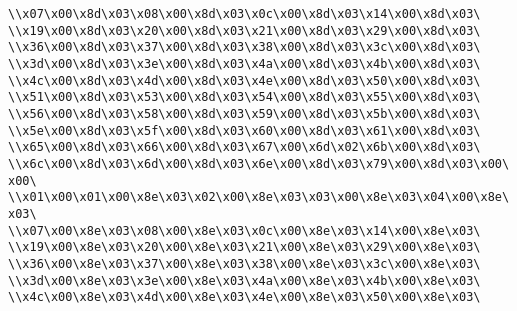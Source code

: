 \verb|\\x07\x00\x8d\x03\x08\x00\x8d\x03\x0c\x00\x8d\x03\x14\x00\x8d\x03\|\newline
\verb|\\x19\x00\x8d\x03\x20\x00\x8d\x03\x21\x00\x8d\x03\x29\x00\x8d\x03\|\newline
\verb|\\x36\x00\x8d\x03\x37\x00\x8d\x03\x38\x00\x8d\x03\x3c\x00\x8d\x03\|\newline
\verb|\\x3d\x00\x8d\x03\x3e\x00\x8d\x03\x4a\x00\x8d\x03\x4b\x00\x8d\x03\|\newline
\verb|\\x4c\x00\x8d\x03\x4d\x00\x8d\x03\x4e\x00\x8d\x03\x50\x00\x8d\x03\|\newline
\verb|\\x51\x00\x8d\x03\x53\x00\x8d\x03\x54\x00\x8d\x03\x55\x00\x8d\x03\|\newline
\verb|\\x56\x00\x8d\x03\x58\x00\x8d\x03\x59\x00\x8d\x03\x5b\x00\x8d\x03\|\newline
\verb|\\x5e\x00\x8d\x03\x5f\x00\x8d\x03\x60\x00\x8d\x03\x61\x00\x8d\x03\|\newline
\verb|\\x65\x00\x8d\x03\x66\x00\x8d\x03\x67\x00\x6d\x02\x6b\x00\x8d\x03\|\newline
\verb|\\x6c\x00\x8d\x03\x6d\x00\x8d\x03\x6e\x00\x8d\x03\x79\x00\x8d\x03\x00\x00\|\newline
\verb|\\x01\x00\x01\x00\x8e\x03\x02\x00\x8e\x03\x03\x00\x8e\x03\x04\x00\x8e\x03\|\newline
\verb|\\x07\x00\x8e\x03\x08\x00\x8e\x03\x0c\x00\x8e\x03\x14\x00\x8e\x03\|\newline
\verb|\\x19\x00\x8e\x03\x20\x00\x8e\x03\x21\x00\x8e\x03\x29\x00\x8e\x03\|\newline
\verb|\\x36\x00\x8e\x03\x37\x00\x8e\x03\x38\x00\x8e\x03\x3c\x00\x8e\x03\|\newline
\verb|\\x3d\x00\x8e\x03\x3e\x00\x8e\x03\x4a\x00\x8e\x03\x4b\x00\x8e\x03\|\newline
\verb|\\x4c\x00\x8e\x03\x4d\x00\x8e\x03\x4e\x00\x8e\x03\x50\x00\x8e\x03\|\newline
